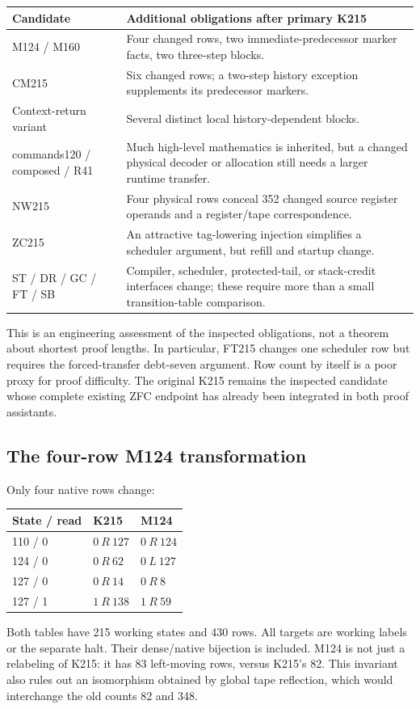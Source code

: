 \documentclass[11pt]{article}
\theoremstyle{remark}\newtheorem{remark}[theorem]{Remark}
\begin{document}
\begin{center}
\begin{tabularx}{\linewidth}{p{.23\linewidth}Y}
\toprule
Candidate & Additional obligations after primary K215 \\
\midrule
M124 / M160 & Four changed rows, two immediate-predecessor marker facts, two three-step blocks. \\
CM215 & Six changed rows; a two-step history exception supplements its predecessor markers. \\
Context-return variant & Several distinct local history-dependent blocks. \\
commands120 / composed / R41 & Much high-level mathematics is inherited, but a changed physical decoder or allocation still needs a larger runtime transfer. \\
NW215 & Four physical rows conceal 352 changed source register operands and a register/tape correspondence. \\
ZC215 & An attractive tag-lowering injection simplifies a scheduler argument, but refill and startup change. \\
ST / DR / GC / FT / SB & Compiler, scheduler, protected-tail, or stack-credit interfaces change; these require more than a small transition-table comparison. \\
\bottomrule
\end{tabularx}
\end{center}
This is an engineering assessment of the inspected obligations, not a theorem about shortest proof lengths. In particular, FT215 changes one scheduler row but requires the forced-transfer debt-seven argument. Row count by itself is a poor proxy for proof difficulty. The original K215 remains the inspected candidate whose complete existing ZFC endpoint has already been integrated in both proof assistants.

\subsection{The four-row M124 transformation}

Only four native rows change:
\begin{center}
\begin{tabular}{lll}
\toprule
State / read & K215 & M124 \\
\midrule
110 / 0 & $0\ R\ 127$ & $0\ R\ 124$ \\
124 / 0 & $0\ R\ 62$ & $0\ L\ 127$ \\
127 / 0 & $0\ R\ 14$ & $0\ R\ 8$ \\
127 / 1 & $1\ R\ 138$ & $1\ R\ 59$ \\
\bottomrule
\end{tabular}
\end{center}
Both tables have 215 working states and 430 rows. All targets are working labels or the separate halt. Their dense/native bijection is included. M124 is not just a relabeling of K215: it has 83 left-moving rows, versus K215's 82. This invariant also rules out an isomorphism obtained by global tape reflection, which would interchange the old counts 82 and 348.
\end{document}
